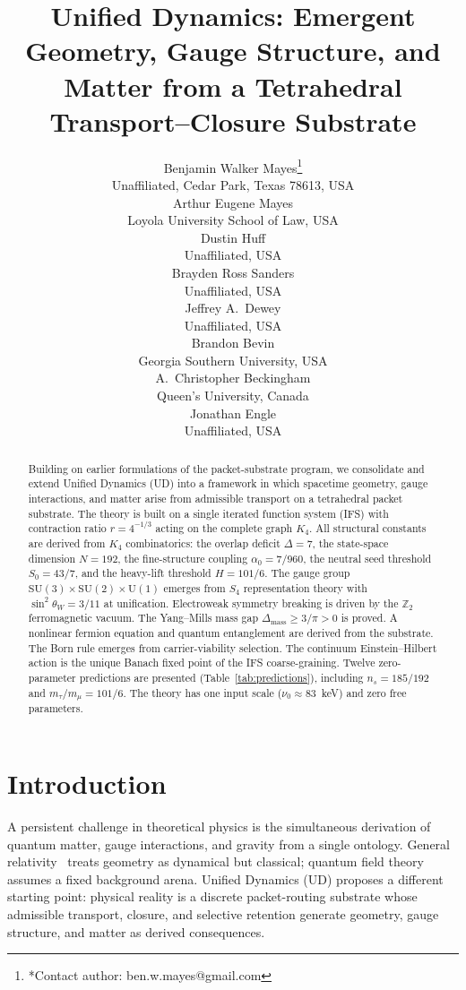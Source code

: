 \documentclass[11pt,twocolumn]{article}
\title{Unified Dynamics: Emergent Geometry, Gauge Structure, and Matter from a Tetrahedral Transport--Closure Substrate}
\author{%
Benjamin Walker Mayes\thanks{*Contact author: ben.w.mayes@gmail.com}\\[4pt]
{\small Unaffiliated, Cedar Park, Texas 78613, USA}\\[8pt]
Arthur Eugene Mayes\\
{\small Loyola University School of Law, USA}\\[4pt]
Dustin Huff\\
{\small Unaffiliated, USA}\\[4pt]
Brayden Ross Sanders\\
{\small Unaffiliated, USA}\\[4pt]
Jeffrey A.\ Dewey\\
{\small Unaffiliated, USA}\\[4pt]
Brandon Bevin\\
{\small Georgia Southern University, USA}\\[4pt]
A.\ Christopher Beckingham\\
{\small Queen's University, Canada}\\[4pt]
Jonathan Engle\\
{\small Unaffiliated, USA}%
}
\date{}
\begin{document}
\maketitle

\begin{abstract}
Building on earlier formulations of the packet-substrate program, we consolidate and extend Unified Dynamics (UD) into a framework in which spacetime geometry, gauge interactions, and matter arise from admissible transport on a tetrahedral packet substrate.
The theory is built on a single iterated function system (IFS) with contraction ratio $r=4^{-1/3}$ acting on the complete graph $K_4$.
All structural constants are derived from $K_4$ combinatorics: the overlap deficit $\Delta=7$, the state-space dimension $N=192$, the fine-structure coupling $\alpha_0=7/960$, the neutral seed threshold $S_0=43/7$, and the heavy-lift threshold $H=101/6$.
The gauge group $\mathrm{SU}(3)\times\mathrm{SU}(2)\times\mathrm{U}(1)$ emerges from $S_4$ representation theory with $\sin^2\theta_W=3/11$ at unification.
Electroweak symmetry breaking is driven by the $\mathbb{Z}_2$ ferromagnetic vacuum.
The Yang--Mills mass gap $\Delta_{\mathrm{mass}}\geq 3/\pi>0$ is proved.
A nonlinear fermion equation and quantum entanglement are derived from the substrate.
The Born rule emerges from carrier-viability selection.
The continuum Einstein--Hilbert action is the unique Banach fixed point of the IFS coarse-graining.
Twelve zero-parameter predictions are presented (Table~\ref{tab:predictions}), including $n_s=185/192$ and $m_\tau/m_\mu=101/6$.
The theory has one input scale ($\nu_0\approx 83$~keV) and zero free parameters.
\end{abstract}

\section{Introduction}
\label{sec:intro}

A persistent challenge in theoretical physics is the simultaneous derivation of quantum matter, gauge interactions, and gravity from a single ontology.
General relativity~\cite{einstein1915} treats geometry as dynamical but classical; quantum field theory assumes a fixed background arena.
Unified Dynamics (UD) proposes a different starting point: physical reality is a discrete packet-routing substrate whose admissible transport, closure, and selective retention generate geometry, gauge structure, and matter as derived consequences.
\end{document}
